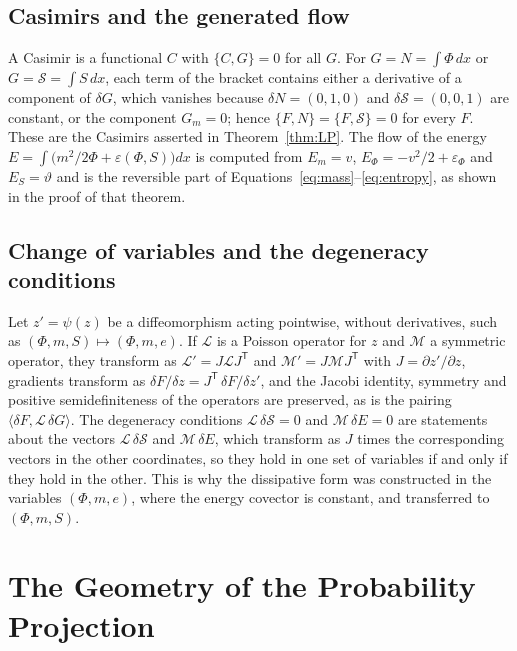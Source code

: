 \documentclass[11pt,oneside]{book}
\theoremstyle{definition}
\theoremstyle{remark}
\newcommand{\mathscr}[1]{\mathcal{#1}}
\begin{document}
\section*{Casimirs and the generated flow}

A Casimir is a functional $C$ with $\{C,G\}=0$ for all $G$. For $G=N=\int\Phi\,dx$ or $G=\mathscr S=\int S\,dx$, each term of the bracket contains either a derivative of a component of $\delta G$, which vanishes because $\delta N=(0,1,0)$ and $\delta\mathscr S=(0,0,1)$ are constant, or the component $G_m=0$; hence $\{F,N\}=\{F,\mathscr S\}=0$ for every $F$. These are the Casimirs asserted in Theorem~\ref{thm:LP}. The flow of the energy $E=\int\bigl(m^2/2\Phi+\varepsilon(\Phi,S)\bigr)dx$ is computed from $E_m=v$, $E_\Phi=-v^2/2+\varepsilon_\Phi$ and $E_S=\vartheta$ and is the reversible part of Equations~\eqref{eq:mass}--\eqref{eq:entropy}, as shown in the proof of that theorem.

\section*{Change of variables and the degeneracy conditions}

Let $z'=\psi(z)$ be a diffeomorphism acting pointwise, without derivatives, such as $(\Phi,m,S)\mapsto(\Phi,m,e)$. If $\mathcal L$ is a Poisson operator for $z$ and $\mathcal M$ a symmetric operator, they transform as $\mathcal L'=J\mathcal LJ^{\mathsf T}$ and $\mathcal M'=J\mathcal MJ^{\mathsf T}$ with $J=\partial z'/\partial z$, gradients transform as $\delta F/\delta z=J^{\mathsf T}\,\delta F/\delta z'$, and the Jacobi identity, symmetry and positive semidefiniteness of the operators are preserved, as is the pairing $\langle\delta F,\mathcal L\,\delta G\rangle$. The degeneracy conditions $\mathcal L\,\delta\mathscr S=0$ and $\mathcal M\,\delta E=0$ are statements about the vectors $\mathcal L\,\delta\mathscr S$ and $\mathcal M\,\delta E$, which transform as $J$ times the corresponding vectors in the other coordinates, so they hold in one set of variables if and only if they hold in the other. This is why the dissipative form was constructed in the variables $(\Phi,m,e)$, where the energy covector is constant, and transferred to $(\Phi,m,S)$.

\chapter{The Geometry of the Probability Projection}\label{app:geometry}
\end{document}
